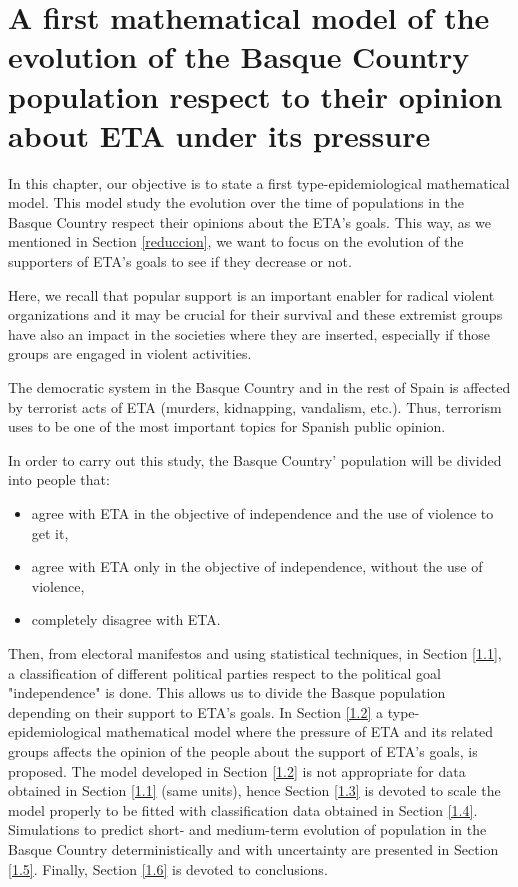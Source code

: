 
\chapter{A first mathematical model of the evolution of the Basque Country population respect to their opinion about ETA under its pressure}\label{paper1}

In this chapter, our objective is to state a first type-epidemiological mathematical model. This model study the evolution over the time of populations in the Basque Country respect their opinions about the ETA's goals. This way, as we mentioned in Section \ref{reduccion}, we want to focus on the evolution of the supporters of ETA's goals to see if they decrease or not.

Here, we recall that popular support is an important enabler for radical violent organizations and it may be crucial for their survival and these extremist groups have also an impact in the societies where they are inserted, especially if those groups are engaged in violent activities. 

The democratic system in the Basque Country and in the rest of Spain is affected by terrorist acts of ETA (murders, kidnapping, vandalism, etc.). Thus, terrorism uses to be one of the most important topics for Spanish public opinion.

In order to carry out this study, the Basque Country' population will be divided into people that:

\begin{itemize}
\item agree with ETA in the objective of independence and the use of
violence to get it,
\item agree with ETA only in the objective of independence, without the use
of violence,
\item completely disagree with ETA.
\end{itemize}

Then, from electoral manifestos and using statistical techniques, in Section \ref{1.1}, a classification of different political parties respect to the political goal "independence" is done. This allows us to divide the Basque population depending on their support to ETA's goals. In Section \ref{1.2} a type-epidemiological mathematical model where the pressure of ETA and its related groups affects the opinion of the people about the support of ETA's goals, is proposed. The model developed in Section \ref{1.2} is not appropriate for data obtained in Section \ref{1.1} (same units), hence Section \ref{1.3} is devoted to scale the model properly to be fitted with classification data obtained in Section \ref{1.4}. Simulations to predict short- and medium-term evolution of population in the Basque Country deterministically and with uncertainty are presented in Section \ref{1.5}. Finally, Section \ref{1.6} is devoted to conclusions.

